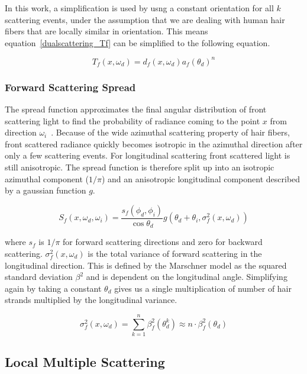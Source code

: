 In this work, a simplification is used by usng a constant orientation for all $k$ scattering events, under the assumption that we are dealing with human hair fibers that are locally similar in orientation. This means equation~\ref{dualscattering_Tf} can be simplified to the following equation.

\begin{equation}
T_f(x, \omega_d) = d_f(x, \omega_d) a_f(\theta_d)^n
\label{forwardscattering}
\end{equation}

\subsubsection{Forward Scattering Spread}

The spread function approximates the final angular distribution of front scattering light to find the probability of radiance coming to the point $x$ from direction $\omega_i$~\cite{zinke}. Because of the wide azimuthal scattering property of hair fibers, front scattered radiance quickly becomes isotropic in the azimuthal direction after only a few scattering events. For longitudinal scattering front scattered light is still anisotropic. The spread function is therefore split up into an isotropic azimuthal component ($1/\pi$) and an anisotropic longitudinal component described by a gaussian function $g$.

\begin{equation}
\label{dualscattering_Sf}
S_f(x, \omega_d, \omega_i) = \frac{s_f(\phi_d, \phi_i)}{\cos \theta_d} g(\theta_d + \theta_i, \sigma_f^2(x, \omega_d))
\end{equation}

where $s_f$ is $1/\pi$ for forward scattering directions and zero for backward scattering. $\sigma_f^2(x, \omega_d)$ is the total variance of forward scattering in the longitudinal direction. This is defined by the Marschner model as the squared standard deviation $\beta^2$ and is dependent on the longitudinal angle. Simplifying again by taking a constant $\theta_d$ gives us a single multiplication of number of hair strands multiplied by the longitudinal variance.

\begin{equation}
\sigma_f^2(x, \omega_d) = \sum_{k=1}^{n} \beta_f^2(\theta_d^k) \approx n \cdot \beta_f^2(\theta_d)
\end{equation}


\subsection{Local Multiple Scattering}

